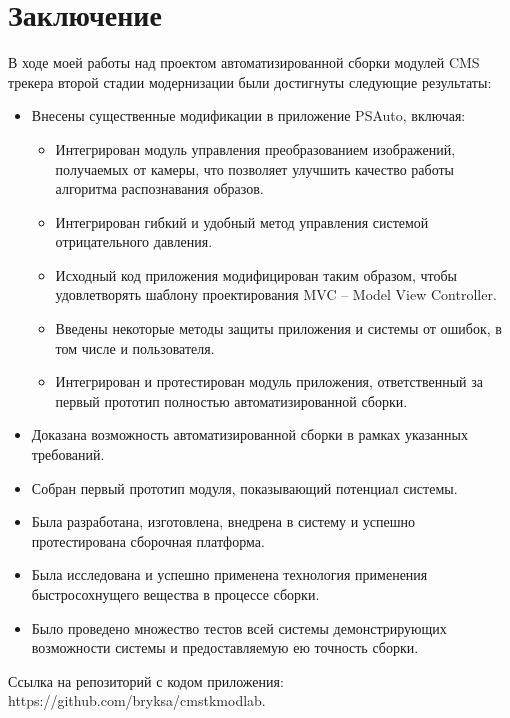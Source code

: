 \chapter{Заключение}

В ходе моей работы над проектом автоматизированной сборки модулей CMS трекера второй стадии модернизации были достигнуты следующие результаты:

\begin{itemize}
\item Внесены существенные модификации в приложение PSAuto, включая:
\begin{itemize}
\item Интегрирован модуль управления преобразованием изображений, получаемых от камеры, что позволяет улучшить качество работы алгоритма распознавания образов.
\item Интегрирован гибкий и удобный метод управления системой отрицательного давления.
\item Исходный код приложения модифицирован таким образом, чтобы удовлетворять шаблону проектирования MVC – Model View Controller.
\item Введены некоторые методы защиты приложения и системы от ошибок, в том числе и пользователя.
\item Интегрирован и протестирован модуль приложения, ответственный за первый прототип полностью автоматизированной сборки.
\end{itemize}
\item Доказана возможность автоматизированной сборки в рамках указанных требований.
\item Собран первый прототип модуля, показывающий потенциал системы.
\item Была разработана, изготовлена, внедрена в систему и успешно протестирована сборочная платформа.
\item Была исследована и успешно применена технология применения быстросохнущего вещества в процессе сборки.
\item Было проведено множество тестов всей системы демонстрирующих возможности системы и предоставляемую ею точность сборки.
\end{itemize}

Ссылка на репозиторий с кодом приложения: https://github.com/bryksa/cmstkmodlab.




